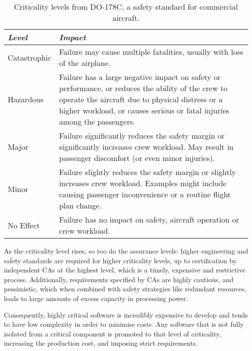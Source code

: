 \begin{table}
     \centering
     \begin{tabular}{ l p{10cm}} \toprule
         \emph{Level}   & \emph{Impact} \\ \midrule
         Catastrophic   & Failure may cause multiple fatalities, usually with loss of the airplane. \\
         Hazardous      & Failure has a large negative impact on safety or performance, or reduces the
                          ability of the crew to operate the aircraft due to physical distress or 
                          a higher workload, or causes serious or fatal injuries among the passengers.\\
         Major          & Failure significantly reduces the safety margin or significantly increases
                          crew workload. May result in passenger discomfort (or even minor
                          injuries).\\
         Minor          & Failure slightly reduces the safety margin or slightly increases crew
                          workload. Examples might include causing passenger inconvenience or a
                          routine flight plan change. \\
         No Effect      & Failure has no impact on safety, aircraft operation or crew workload. \\
         \bottomrule
     \end{tabular}
     \caption[Criticality levels from DO-178C]{Criticality levels from DO-178C, a safety standard for commercial aircraft.}
     \label{tab:criticality_table}
 \end{table}

As the criticality level rises, so too do the assurance levels: higher engineering and safety standards are required for higher criticality levels, up to
certification by independent \glspl{CA} at the highest level, which is a timely,
expensive and restrictive process. Additionally, requirements specified by \glspl{CA} are highly
cautious, and pessimistic, which when combined with safety strategies like redundant resources,
leads to large amounts of excess capacity in processing power. 

Consequently, highly
critical software is incredibly expensive to develop and tends to have low complexity in order to
minimise costs. Any software that is not fully isolated from a critical component is promoted to
that level of criticality, increasing the production cost, and imposing strict requirements.


